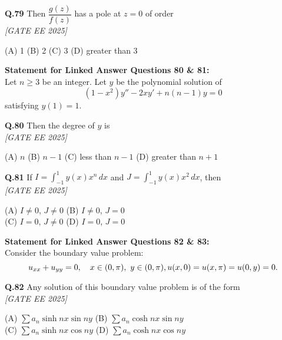 \documentclass[11pt]{article}
\begin{document}
\begin{flushleft}
\textbf{Q.79} Then $\dfrac{g(z)}{f(z)}$ has a pole at $z = 0$ of order 
\\[1ex] \textit{[GATE EE 2025]}

(A) 1 \hspace{2em} (B) 2 \hspace{2em} (C) 3 \hspace{2em} (D) greater than 3
\end{flushleft}

\bigskip

\noindent\textbf{Statement for Linked Answer Questions 80 \& 81:} \\
Let $n \geq 3$ be an integer. Let $y$ be the polynomial solution of \\
\[
(1 - x^2)y'' - 2xy' + n(n-1)y = 0
\]
satisfying $y(1) = 1$.

\begin{flushleft}
\textbf{Q.80} Then the degree of $y$ is
\\[1ex] \textit{[GATE EE 2025]}


(A) $n$ \hspace{2em} (B) $n - 1$ \hspace{2em} (C) less than $n - 1$ \hspace{2em} (D) greater than $n + 1$
\end{flushleft}

\begin{flushleft}
\textbf{Q.81} If $I = \int_{-1}^{1} y(x) x^n \, dx$ and $J = \int_{-1}^{1} y(x) x^2 \, dx$, then 
\\[1ex] \textit{[GATE EE 2025]}

(A) $I \neq 0$, $J \neq 0$ \hspace{2em}
(B) $I \neq 0$, $J = 0$ \\
(C) $I = 0$, $J \neq 0$ \hspace{2em}
(D) $I = 0$, $J = 0$
\end{flushleft}

\noindent\textbf{Statement for Linked Answer Questions 82 \& 83:} \\
Consider the boundary value problem:
\[
u_{xx} + u_{yy} = 0,\quad x \in (0,\pi),\ y \in (0,\pi), \\
u(x,0) = u(x,\pi) = u(0,y) = 0.
\]

\begin{flushleft}
\textbf{Q.82} Any solution of this boundary value problem is of the form 
\\[1ex] \textit{[GATE EE 2025]}


(A) $\sum a_n \sinh nx \sin ny$ \hspace{2em}
(B) $\sum a_n \cosh nx \sin ny$ \\
(C) $\sum a_n \sinh nx \cos ny$ \hspace{2em}
(D) $\sum a_n \cosh nx \cos ny$
\end{flushleft}
\end{document}
